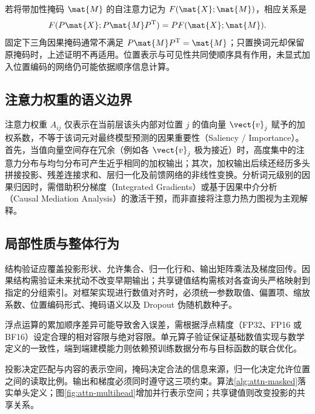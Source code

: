 \documentclass[../textbook.tex]{subfiles}
\begin{document}
若将带加性掩码 $\mat{M}$ 的自注意力记为 $F(\mat{X};\mat{M})$，相应关系是
\begin{equation}
 F(P\mat{X};P\mat{M}P^{\mathrm{T}})=PF(\mat{X};\mat{M}).
\end{equation}
固定下三角因果掩码通常不满足 $P\mat{M}P^{\mathrm{T}}=\mat{M}$；只置换词元却保留原掩码时，上述证明不再适用。位置表示与可见性共同使顺序具有作用，未显式加入位置编码的网络仍可能依据顺序信息计算。

\subsection{注意力权重的语义边界}
注意力权重 $A_{ij}$ 仅表示在当前层该头内部对位置 $j$ 的值向量 $\vect{v}_j$ 赋予的加权系数，不等于该词元对最终模型预测的因果重要性（Saliency / Importance）。首先，当值向量空间存在冗余（例如各 $\vect{v}_j$ 极为接近）时，高度集中的注意力分布与均匀分布可产生近乎相同的加权输出；其次，加权输出后续还经历多头拼接投影、残差连接求和、层归一化及前馈网络的非线性变换。分析词元级别的因果归因时，需借助积分梯度（Integrated Gradients）或基于因果中介分析（Causal Mediation Analysis）的激活干预，而非直接将注意力热力图视为主观解释。

\subsection{局部性质与整体行为}
结构验证应覆盖投影形状、允许集合、归一化行和、输出矩阵乘法及梯度回传。因果结构需验证未来扰动不改变早期输出；共享键值结构需核对各查询头严格映射到指定的分组索引。对框架实现进行数值对齐时，必须统一参数取值、偏置项、缩放系数、位置编码形式、掩码语义以及 Dropout 伪随机数种子。

浮点运算的累加顺序差异可能导致舍入误差，需根据浮点精度（FP32、FP16 或 BF16）设定合理的相对容限与绝对容限。单元算子验证保证基础数值实现与数学定义的一致性，端到端建模能力则依赖预训练数据分布与目标函数的联合优化。


\begin{note}[注意力计算的结构约束]
投影决定匹配与内容的表示空间，掩码决定合法的信息来源，归一化决定允许位置之间的读取比例。输出和梯度必须同时遵守这三项约束。算法\ref{alg:attn-masked}落实单头定义；图\ref{fig:attn-multihead}增加并行表示空间；共享键值则改变投影的共享关系。
\end{note}


\chapterreferences
\myendchapterdocument
\end{document}
